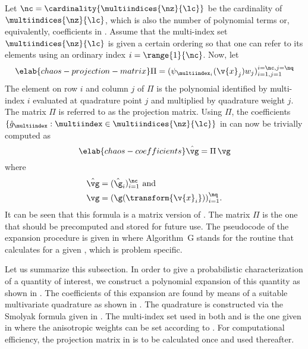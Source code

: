 Let $\nc = \cardinality{\multiindices{\nz}{\lc}}$ be the cardinality of
$\multiindices{\nz}{\lc}$, which is also the number of polynomial terms or,
equivalently, coefficients in . Assume that the
multi-index set $\multiindices{\nz}{\lc}$ is given a certain ordering so that
one can refer to its elements using an ordinary index $i = \range{1}{\nc}$. Now,
let
\begin{equation} \elab{chaos-projection-matrix}
  \Pi = (\psi_{\multiindex_i}(\v{x}_j) w_j)_{i = 1, j = 1}^{i = \nc, j = \nq}
\end{equation}
The element on row $i$ and column $j$ of $\Pi$ is the polynomial identified by
multi-index $i$ evaluated at quadrature point $j$ and multiplied by quadrature
weight $j$. The matrix $\Pi$ is referred to as the projection matrix. Using
$\Pi$, the coefficients $\{ \hat{g}_{\multiindex}: \multiindex \in
\multiindices{\nz}{\lc} \}$ in  can now be trivially
computed as
\begin{equation} \elab{chaos-coefficients}
  \hat{\vg} = \Pi \, \vg
\end{equation}
where
\begin{align*}
  & \hat{\vg} = (\hat{\g}_i)_{i = 1}^\nc \text{ and} \\
  & \vg = (\g(\transform{\v{x}_i}))_{i = 1}^\nq.
\end{align*}
It can be seen that this formula is a matrix version of
. The matrix $\Pi$ is the one that should be precomputed
and stored for future use. The pseudocode of the expansion procedure is given in
 where Algorithm~G stands for the routine that calculates
\g for a given \vu, which is problem specific.

Let us summarize this subsection. In order to give a probabilistic
characterization of a quantity of interest, we construct a polynomial expansion
of this quantity as shown in . The coefficients of this
expansion are found by means of a suitable multivariate quadrature as shown in
. The quadrature is constructed via the Smolyak formula
given in . The multi-index set used in both
 and  is the one given in
 where the anisotropic weights can be set
according to . For computational efficiency, the
projection matrix in  is to be calculated once and
used thereafter.

